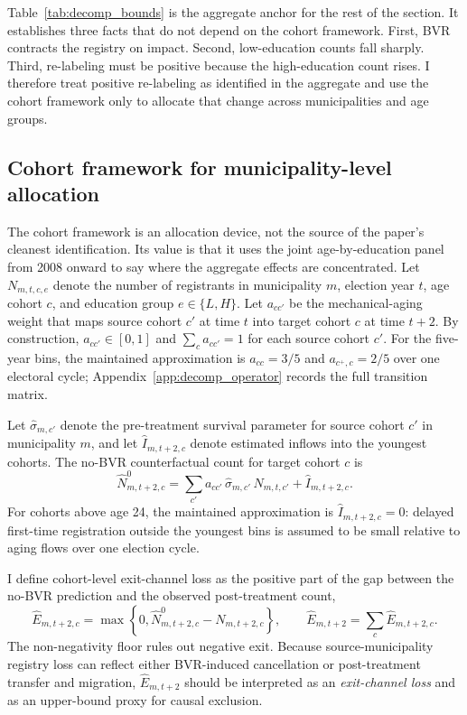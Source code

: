 Table~\ref{tab:decomp_bounds} is the aggregate anchor for the rest of the section. It establishes three facts that do not depend on the cohort framework. First, BVR contracts the registry on impact. Second, low-education counts fall sharply. Third, re-labeling must be positive because the high-education count rises. I therefore treat positive re-labeling as identified in the aggregate and use the cohort framework only to allocate that change across municipalities and age groups.

\subsection{Cohort framework for municipality-level allocation}
\label{ssec:decomposition_mun_math}

The cohort framework is an allocation device, not the source of the paper's cleanest identification. Its value is that it uses the joint age-by-education panel from 2008 onward to say where the aggregate effects are concentrated. Let $N_{m,t,c,e}$ denote the number of registrants in municipality $m$, election year $t$, age cohort $c$, and education group $e \in \{L,H\}$. Let $a_{cc'}$ be the mechanical-aging weight that maps source cohort $c'$ at time $t$ into target cohort $c$ at time $t+2$. By construction, $a_{cc'} \in [0,1]$ and $\sum_c a_{cc'} = 1$ for each source cohort $c'$. For the five-year bins, the maintained approximation is $a_{cc}=3/5$ and $a_{c^+,c}=2/5$ over one electoral cycle; Appendix~\ref{app:decomp_operator} records the full transition matrix.

Let $\hat\sigma_{m,c'}$ denote the pre-treatment survival parameter for source cohort $c'$ in municipality $m$, and let $\hat I_{m,t+2,c}$ denote estimated inflows into the youngest cohorts. The no-BVR counterfactual count for target cohort $c$ is
\begin{equation}
\widehat N^{0}_{m,t+2,c} = \sum_{c'} a_{cc'}\,\hat\sigma_{m,c'}\,N_{m,t,c'} + \hat I_{m,t+2,c}.
\label{eq:counterfactual_main_revised}
\end{equation}
For cohorts above age 24, the maintained approximation is $\hat I_{m,t+2,c}=0$: delayed first-time registration outside the youngest bins is assumed to be small relative to aging flows over one election cycle.

I define cohort-level exit-channel loss as the positive part of the gap between the no-BVR prediction and the observed post-treatment count,
\begin{equation}
\widehat E_{m,t+2,c} = \max\!\left\{0,\widehat N^{0}_{m,t+2,c} - N_{m,t+2,c}\right\},
\qquad
\widehat E_{m,t+2} = \sum_c \widehat E_{m,t+2,c}.
\label{eq:exit_main_revised}
\end{equation}
The non-negativity floor rules out negative exit. Because source-municipality registry loss can reflect either BVR-induced cancellation or post-treatment transfer and migration, $\widehat E_{m,t+2}$ should be interpreted as an \emph{exit-channel loss} and as an upper-bound proxy for causal exclusion.

